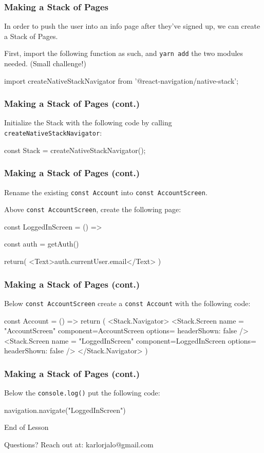 \documentclass{beamer}
\begin{document}
    \begin{frame}[fragile]
      \frametitle{Making a Stack of Pages}
      In order to push the user into an info page after they've signed up, we can create a Stack of Pages. 

      First, import the following function as such, and \verb|yarn add| the two modules needed. (Small challenge!)

      \begin{jscodesmall}
import {createNativeStackNavigator} from '@react-navigation/native-stack';
      \end{jscodesmall}
    \end{frame}
    \begin{frame}[fragile]
      \frametitle{Making a Stack of Pages (cont.)}
      Initialize the Stack with the following code by calling \verb|createNativeStackNavigator|:

      \begin{jscode}
const Stack = createNativeStackNavigator();
      \end{jscode}
    \end{frame}
    \begin{frame}[fragile]
      \frametitle{Making a Stack of Pages (cont.)}
      Rename the existing \verb|const Account| into \verb|const AccountScreen|. 

      Above \verb|const AccountScreen|, create the following page: 

      \begin{jscodesmall}
const LoggedInScreen = () => {
  const auth = getAuth()

  return( 
    <Text>{auth.currentUser.email}</Text>
  )
}
      \end{jscodesmall}
    \end{frame}
    \begin{frame}[fragile]
      \frametitle{Making a Stack of Pages (cont.)}
      Below \verb|const AccountScreen| create a \verb|const Account| with the following code: 

      \begin{jscodesmall}
const Account = () => {
  return (
    <Stack.Navigator>
      <Stack.Screen
      name = "AccountScreen"
      component={AccountScreen}
      options={{ headerShown: false }}
      />
      <Stack.Screen
      name = "LoggedInScreen"
      component={LoggedInScreen}
      options={{ headerShown: false }}
      />
    </Stack.Navigator>
  )
}        
      \end{jscodesmall}
    \end{frame}
    \begin{frame}[fragile]
      \frametitle{Making a Stack of Pages (cont.)}
      Below the \verb|console.log()| put the following code:

      \begin{jscodesmall}
navigation.navigate("LoggedInScreen")
      \end{jscodesmall}
    \end{frame}

  \appendix

  \begin{frame}[standout]
    End of Lesson

    {\small Questions? Reach out at:}
    {\footnotesize karlorjalo@gmail.com}
  \end{frame}
\end{document}
